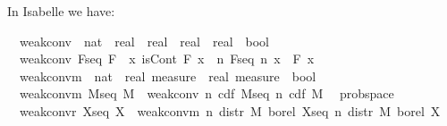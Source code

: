 \documentclass[leqno]{article}
\theoremstyle{definition}
\begin{document}
In Isabelle we have:

\medskip

\begin{isabellebody}
\isamarkupfalse%
\isanewline
\ \ weak{\isacharunderscore}conv\ {\isacharcolon}{\isacharcolon}\ {\isachardoublequoteopen}{\isacharparenleft}nat\ {\isasymRightarrow}\ {\isacharparenleft}real\ {\isasymRightarrow}\ real{\isacharparenright}{\isacharparenright}\ {\isasymRightarrow}\ {\isacharparenleft}real\ {\isasymRightarrow}\ real{\isacharparenright}\ {\isasymRightarrow}\ bool{\isachardoublequoteclose}\isanewline
{}\isanewline
\ \ {\isachardoublequoteopen}weak{\isacharunderscore}conv\ F{\isacharunderscore}seq\ F\ {\isasymequiv}\ {\isasymforall}x{\isachardot}\ isCont\ F\ x\ {\isasymlongrightarrow}\ {\isacharparenleft}{\isasymlambda}n{\isachardot}\ F{\isacharunderscore}seq\ n\ x{\isacharparenright}\ {\isacharminus}{\isacharminus}{\isacharminus}{\isacharminus}{\isachargreater}\ F\ x{\isachardoublequoteclose}\isanewline\isanewline
{}\isamarkupfalse%
\isanewline
\ \ weak{\isacharunderscore}conv{\isacharunderscore}m\ {\isacharcolon}{\isacharcolon}\ {\isachardoublequoteopen}{\isacharparenleft}nat\ {\isasymRightarrow}\ real\ measure{\isacharparenright}\ {\isasymRightarrow}\ real\ measure\ {\isasymRightarrow}\ bool{\isachardoublequoteclose}\isanewline
{}\isanewline
\ \ {\isachardoublequoteopen}weak{\isacharunderscore}conv{\isacharunderscore}m\ M{\isacharunderscore}seq\ M\ {\isasymequiv}\ weak{\isacharunderscore}conv\ {\isacharparenleft}{\isasymlambda}n{\isachardot}\ cdf\ {\isacharparenleft}M{\isacharunderscore}seq\ n{\isacharparenright}{\isacharparenright}\ {\isacharparenleft}cdf\ M{\isacharparenright}{\isachardoublequoteclose}\isanewline\isanewline
{}\isamarkupfalse%
\ {\isacharparenleft}\ prob{\isacharunderscore}space{\isacharparenright}\isanewline
\ \ {\isachardoublequoteopen}weak{\isacharunderscore}conv{\isacharunderscore}r\ X{\isacharunderscore}seq\ X\ {\isasymequiv}\ weak{\isacharunderscore}conv{\isacharunderscore}m\ {\isacharparenleft}{\isasymlambda}n{\isachardot}\ distr\ M\ borel\ {\isacharparenleft}X{\isacharunderscore}seq\ n{\isacharparenright}{\isacharparenright}\ {\isacharparenleft}distr\ M\ borel\ X{\isacharparenright}{\isachardoublequoteclose}
\end{isabellebody}

\medskip
\end{document}
